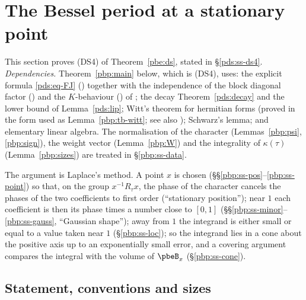 \documentclass[10pt]{amsart}
\theoremstyle{definition}
\theoremstyle{remark}
\begin{document}
\section{The Bessel period at a stationary point}\label{pbp:sec}

This section proves \textup{(DS4)} of Theorem~\ref{pbe:ds}, stated in \S\ref{pds:ss-ds4}.
\emph{Dependencies.} Theorem~\ref{pbp:main} below, which is \textup{(DS4)}, uses:
the explicit formula \eqref{pds:eq-FJ} ({\cite[Theorem~3.17]{P49}}) together with the independence of the
block diagonal factor ({\cite[Proposition~3.21]{P49}}) and the $K$-behaviour ({\cite[Lemma~3.23]{P49}}) of
{\cite[\S3.2]{P49}}; the decay Theorem~\ref{pds:decay} and the lower bound of Lemma~\ref{pds:lip}; Witt's
theorem for hermitian forms (proved in the form used as Lemma~\ref{pbp:tb-witt}; see also \cite[Chapter~7, Theorem~9.1]{Scharlau}); Schwarz's lemma; and elementary linear algebra. The normalisation of
the character (Lemmas~\ref{pbp:psi}, \ref{pbp:sign}), the weight vector (Lemma~\ref{pbp:W}) and the
integrality of $\kappa(\tau)$ (Lemma~\ref{pbp:sizes}) are treated in \S\ref{pbp:ss-data}.

The argument is Laplace's method. A point $x$ is chosen (\S\S\ref{pbp:ss-pos}--\ref{pbp:ss-point})
so that, on the group $x^{-1}R_\tau x$, the phase of the character cancels the phases of the two
coefficients to first order (``stationary position''); near $1$ each coefficient is then its phase
times a number close to $[0,1]$ (\S\S\ref{pbp:ss-minor}--\ref{pbp:ss-gauss}, ``Gaussian shape'');
away from $1$ the integrand is either small or equal to a value taken near $1$
(\S\ref{pbp:ss-loc}); so the integrand lies in a cone about the positive axis up to an
exponentially small error, and a covering argument compares the integral with the volume of
$\pbeB_x$ (\S\ref{pbp:ss-cone}).

\subsection{Statement, conventions and sizes}\label{pbp:ss-stat}
\end{document}
